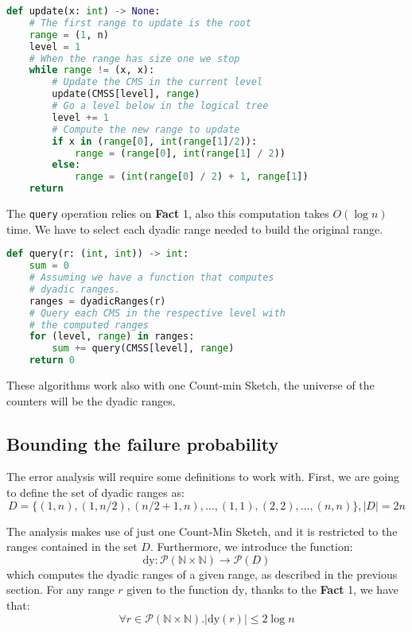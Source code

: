 \documentclass{article}
\begin{document}
\begin{lstlisting}[language=python]
def update(x: int) -> None:
    # The first range to update is the root
    range = (1, n)
    level = 1
    # When the range has size one we stop
    while range != (x, x):
        # Update the CMS in the current level
        update(CMSS[level], range) 
        # Go a level below in the logical tree
        level += 1 
        # Compute the new range to update
        if x in (range[0], int(range[1]/2)):
            range = (range[0], int(range[1] / 2))
        else:
            range = (int(range[0] / 2) + 1, range[1])
    return
\end{lstlisting}

\noindent The \verb+query+ operation relies on \textbf{Fact} 1, also this computation takes $O(\log n)$ time. 
We have to select each dyadic range needed to build the original range.

\begin{lstlisting}[language=python]
def query(r: (int, int)) -> int:
    sum = 0
    # Assuming we have a function that computes
    # dyadic ranges.
    ranges = dyadicRanges(r)
    # Query each CMS in the respective level with
    # the computed ranges
    for (level, range) in ranges:
        sum += query(CMSS[level], range)
    return 0
\end{lstlisting}

\noindent These algorithms work also with one Count-min Sketch, the universe of the counters will be the dyadic ranges.

\subsection{Bounding the failure probability}

The error analysis will require some definitions to work with. First, we are going to define the set of dyadic ranges as:
\begin{equation*}
    D = \{(1, n), (1, {n}/{2}), ({n}/{2} + 1, n), \dots, (1, 1), (2, 2), \dots, (n, n)\}, |D| = 2n
\end{equation*}

\noindent The analysis makes use of just one Count-Min Sketch, and it is restricted to the ranges contained in the set $D$. Furthermore, we
introduce the function:
\begin{equation*}
    \textrm{dy}: \mathcal{P}(\mathbb{N} \times \mathbb{N}) \to \mathcal{P}(D) 
\end{equation*}
which computes the dyadic ranges of a given range, as described in the previous section. For any range $r$ given to the function $\textrm{dy}$, thanks to the \textbf{Fact} 1, we have that:
\begin{equation*}
    \forall r \in \mathcal{P}(\mathbb{N} \times \mathbb{N}). |\textrm{dy}(r)| \le 2 \log n
\end{equation*}
\end{document}

